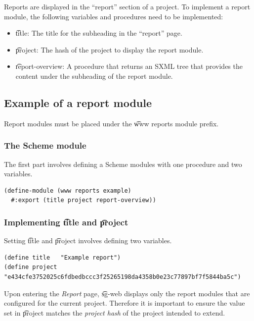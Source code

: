   Reports are displayed in the ``report'' section of a project.  To implement
  a report module, the following variables and procedures need to be implemented:
  \begin{itemize}
  \item \t{title}: The title for the subheading in the ``report'' page.
  \item \t{project}: The hash of the project to display the report module.
  \item \t{report-overview}: A procedure that returns an SXML tree that
    provides the content under the subheading of the report module.
  \end{itemize}

\subsection{Example of a report module}

  Report modules must be placed under the \t{www reports} module prefix.

\subsubsection{The Scheme module}
\label{sec:scheme-module}

  The first part involves defining a Scheme modules with one procedure and
  two variables.

\begin{siderules}
\begin{verbatim}
(define-module (www reports example)
  #:export (title project report-overview))
\end{verbatim}
\end{siderules}

\subsubsection{Implementing \t{title} and \t{project}}

  Setting \t{title} and \t{project} involves defining two variables.

\begin{siderules}
\begin{verbatim}
(define title   "Example report")
(define project "e434cfe3752025c6fdbedbccc3f25265198da4358b0e23c77897bf7f5844ba5c")
\end{verbatim}
\end{siderules}

  Upon entering the \emph{Report} page, \t{sg-web} displays only the report
  modules that are configured for the current project.  Therefore it is
  important to ensure the value set in \t{project} matches the
  \emph{project hash} of the project intended to extend.

